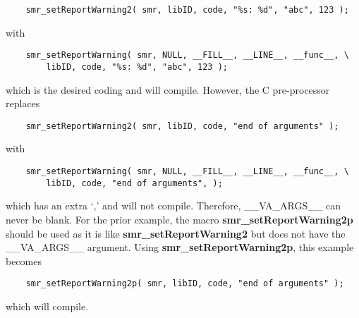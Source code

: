 \documentclass[11pt]{article}
\begin{document}
\begin{verbatim}
    smr_setReportWarning2( smr, libID, code, "%s: %d", "abc", 123 );
\end{verbatim}
with
\begin{verbatim}
    smr_setReportWarning( smr, NULL, __FILL__, __LINE__, __func__, \
        libID, code, "%s: %d", "abc", 123 );
\end{verbatim}
which is the desired coding and will compile. However, the C pre-processor replaces
\begin{verbatim}
    smr_setReportWarning2( smr, libID, code, "end of arguments" );
\end{verbatim}
with
\begin{verbatim}
    smr_setReportWarning( smr, NULL, __FILL__, __LINE__, __func__, \
        libID, code, "end of arguments", );
\end{verbatim}
which has an extra `,' and will not compile. Therefore, \_\_VA\_ARGS\_\_ can never be blank. For the prior example, 
the macro \textbf{smr\_setReportWarning2p} should be used as it is like \textbf{smr\_setReport\-Warning2} 
but does not have the \_\_VA\_ARGS\_\_ argument.
Using \textbf{smr\_setReportWarning2p}, this example becomes
\begin{verbatim}
    smr_setReportWarning2p( smr, libID, code, "end of arguments" );
\end{verbatim}
which will compile.
\end{document}
